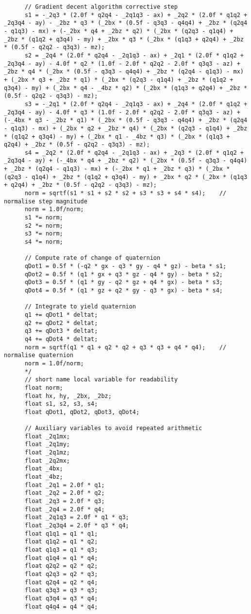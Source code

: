 \begin{lstlisting}
	  // Gradient decent algorithm corrective step
	  s1 = -_2q3 * (2.0f * q2q4 - _2q1q3 - ax) + _2q2 * (2.0f * q1q2 + _2q3q4 - ay) - _2bz * q3 * (_2bx * (0.5f - q3q3 - q4q4) + _2bz * (q2q4 - q1q3) - mx) + (-_2bx * q4 + _2bz * q2) * (_2bx * (q2q3 - q1q4) + _2bz * (q1q2 + q3q4) - my) + _2bx * q3 * (_2bx * (q1q3 + q2q4) + _2bz * (0.5f - q2q2 - q3q3) - mz);
	  s2 = _2q4 * (2.0f * q2q4 - _2q1q3 - ax) + _2q1 * (2.0f * q1q2 + _2q3q4 - ay) - 4.0f * q2 * (1.0f - 2.0f * q2q2 - 2.0f * q3q3 - az) + _2bz * q4 * (_2bx * (0.5f - q3q3 - q4q4) + _2bz * (q2q4 - q1q3) - mx) + (_2bx * q3 + _2bz * q1) * (_2bx * (q2q3 - q1q4) + _2bz * (q1q2 + q3q4) - my) + (_2bx * q4 - _4bz * q2) * (_2bx * (q1q3 + q2q4) + _2bz * (0.5f - q2q2 - q3q3) - mz);
	  s3 = -_2q1 * (2.0f * q2q4 - _2q1q3 - ax) + _2q4 * (2.0f * q1q2 + _2q3q4 - ay) - 4.0f * q3 * (1.0f - 2.0f * q2q2 - 2.0f * q3q3 - az) + (-_4bx * q3 - _2bz * q1) * (_2bx * (0.5f - q3q3 - q4q4) + _2bz * (q2q4 - q1q3) - mx) + (_2bx * q2 + _2bz * q4) * (_2bx * (q2q3 - q1q4) + _2bz * (q1q2 + q3q4) - my) + (_2bx * q1 - _4bz * q3) * (_2bx * (q1q3 + q2q4) + _2bz * (0.5f - q2q2 - q3q3) - mz);
	  s4 = _2q2 * (2.0f * q2q4 - _2q1q3 - ax) + _2q3 * (2.0f * q1q2 + _2q3q4 - ay) + (-_4bx * q4 + _2bz * q2) * (_2bx * (0.5f - q3q3 - q4q4) + _2bz * (q2q4 - q1q3) - mx) + (-_2bx * q1 + _2bz * q3) * (_2bx * (q2q3 - q1q4) + _2bz * (q1q2 + q3q4) - my) + _2bx * q2 * (_2bx * (q1q3 + q2q4) + _2bz * (0.5f - q2q2 - q3q3) - mz);
	  norm = sqrtf(s1 * s1 + s2 * s2 + s3 * s3 + s4 * s4);    // normalise step magnitude
	  norm = 1.0f/norm;
	  s1 *= norm;
	  s2 *= norm;
	  s3 *= norm;
	  s4 *= norm;

	  // Compute rate of change of quaternion
	  qDot1 = 0.5f * (-q2 * gx - q3 * gy - q4 * gz) - beta * s1;
	  qDot2 = 0.5f * (q1 * gx + q3 * gz - q4 * gy) - beta * s2;
	  qDot3 = 0.5f * (q1 * gy - q2 * gz + q4 * gx) - beta * s3;
	  qDot4 = 0.5f * (q1 * gz + q2 * gy - q3 * gx) - beta * s4;

	  // Integrate to yield quaternion
	  q1 += qDot1 * deltat;
	  q2 += qDot2 * deltat;
	  q3 += qDot3 * deltat;
	  q4 += qDot4 * deltat;
	  norm = sqrtf(q1 * q1 + q2 * q2 + q3 * q3 + q4 * q4);    // normalise quaternion
	  norm = 1.0f/norm;
	  */
	  // short name local variable for readability
	  float norm;
	  float hx, hy, _2bx, _2bz;
	  float s1, s2, s3, s4;
	  float qDot1, qDot2, qDot3, qDot4;

	  // Auxiliary variables to avoid repeated arithmetic
	  float _2q1mx;
	  float _2q1my;
	  float _2q1mz;
	  float _2q2mx;
	  float _4bx;
	  float _4bz;
	  float _2q1 = 2.0f * q1;
	  float _2q2 = 2.0f * q2;
	  float _2q3 = 2.0f * q3;
	  float _2q4 = 2.0f * q4;
	  float _2q1q3 = 2.0f * q1 * q3;
	  float _2q3q4 = 2.0f * q3 * q4;
	  float q1q1 = q1 * q1;
	  float q1q2 = q1 * q2;
	  float q1q3 = q1 * q3;
	  float q1q4 = q1 * q4;
	  float q2q2 = q2 * q2;
	  float q2q3 = q2 * q3;
	  float q2q4 = q2 * q4;
	  float q3q3 = q3 * q3;
	  float q3q4 = q3 * q4;
	  float q4q4 = q4 * q4;


\end{lstlisting}
